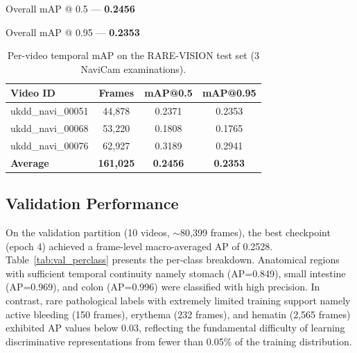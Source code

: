 \documentclass[12pt]{article}
\begin{document}
\vspace{2mm}
\noindent Overall mAP @ 0.5 --- \textbf{0.2456}

\noindent Overall mAP @ 0.95 --- \textbf{0.2353}

\vspace{2mm}

\begin{table}[htbp]
\centering
\caption{Per-video temporal mAP on the RARE-VISION test set (3 NaviCam examinations).}
\label{tab:per_video}
\begin{tabular}{lccc}
\toprule
\textbf{Video ID} & \textbf{Frames} & \textbf{mAP@0.5} & \textbf{mAP@0.95} \\
\midrule
ukdd\_navi\_00051 & 44,878 & 0.2371 & 0.2353 \\
ukdd\_navi\_00068 & 53,220 & 0.1808 & 0.1765 \\
ukdd\_navi\_00076 & 62,927 & 0.3189 & 0.2941 \\
\midrule
\textbf{Average} & \textbf{161,025} & \textbf{0.2456} & \textbf{0.2353} \\
\bottomrule
\end{tabular}
\end{table}

\subsection{Validation Performance}

On the validation partition (10 videos, $\sim$80,399 frames), the best checkpoint (epoch 4) achieved a frame-level macro-averaged AP of 0.2528. Table~\ref{tab:val_perclass} presents the per-class breakdown. Anatomical regions with sufficient temporal continuity namely stomach (AP=0.849), small intestine (AP=0.969), and colon (AP=0.996) were classified with high precision. In contrast, rare pathological labels with extremely limited training support namely active bleeding (150 frames), erythema (232 frames), and hematin (2,565 frames) exhibited AP values below 0.03, reflecting the fundamental difficulty of learning discriminative representations from fewer than 0.05\% of the training distribution.
\end{document}
